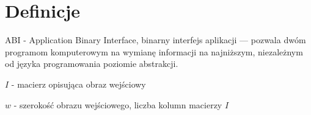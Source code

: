 \chapter{Definicje}
\begin{list}{}{\leftmargin=0em}

\item ABI - Application Binary Interface, binarny interfejs aplikacji --- pozwala dwóm programom komputerowym na wymianę informacji na najniższym, niezależnym od języka programowania poziomie abstrakcji.

\item $I$ - macierz opisująca obraz wejściowy
\item $w$ - szerokość obrazu wejściowego, liczba kolumn macierzy $I$


\end{list}